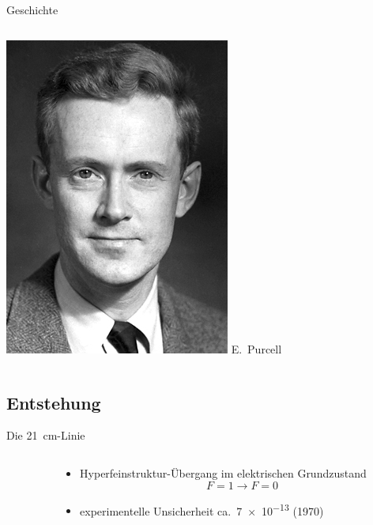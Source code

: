 \begin{frame}{Geschichte}
\begin{columns}[c, onlytextwidth]
      \includegraphics[width=\linewidth]{./images/Edward_Mills_Purcell.jpg}%
      \newline E.~Purcell
  \end{columns}%
\end{frame}
\subsection{Entstehung}
\begin{frame}{Die \SI{21}{\centi\meter}-Linie}
  \begin{columns}[c, onlytextwidth]%
    \begin{column}{0.6\textwidth}%
      
    \end{column}%
    \begin{column}{0.4\textwidth}%
      \begin{itemize}
        \item Hyperfeinstruktur-Übergang im elektrischen Grundzustand
          \begin{equation*}
            F = 1 → F = 0
          \end{equation*}
        \item experimentelle Unsicherheit ca.\ \num{7e-13} (1970) \cite{h1freq}
      \end{itemize}
    \end{column}%
  \end{columns}%
\end{frame}

